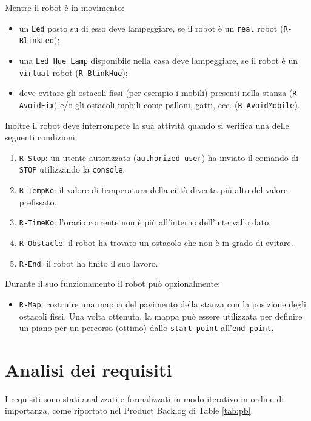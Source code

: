 \documentclass{llncs}
\newcommand{\action}[1]{\texttt{#1}\xspace}
\newcommand{\code}[1]{{\color{blue}\small{\texttt{#1}}}}
\newcommand{\fname}[1]{{\color{magenta}\small{\texttt{#1}}}}
\newcommand{\labelsec}[1]{\label{sec:#1}}
\begin{document}
Mentre il robot è in movimento:
\begin{itemize}
\item un \action{Led} posto su di esso deve lampeggiare, se il robot è un \fname{real} robot (\code{R-BlinkLed});
\item una \action{Led Hue Lamp} disponibile nella casa deve lampeggiare, se il robot è un \fname{virtual} robot (\code{R-BlinkHue});
\item deve evitare gli ostacoli fissi (per esempio i mobili) presenti nella stanza (\code{R-AvoidFix}) e/o gli ostacoli mobili come palloni, gatti, ecc. (\code{R-AvoidMobile}).
\end{itemize}

Inoltre il robot deve interrompere la sua attività quando si verifica una delle seguenti condizioni:
\begin{enumerate}
\item \code{R-Stop}: un utente autorizzato (\code{authorized user}) ha inviato il comando di \action{STOP} utilizzando la \code{console}.
\item \code{R-TempKo}: il valore di temperatura della città diventa più alto del valore prefissato.
\item \code{R-TimeKo}: l'orario corrente non è più all'interno dell'intervallo dato.
\item \code{R-Obstacle}: il robot ha trovato un ostacolo che non è in grado di evitare.
\item \code{R-End}: il robot ha finito il suo lavoro.
\end{enumerate}

Durante il suo funzionamento il robot può opzionalmente:
\begin{itemize}
\item \code{R-Map}: costruire una mappa del pavimento della stanza con la posizione degli ostacoli fissi. Una volta ottenuta, la mappa può essere utilizzata per definire un piano per un percorso (ottimo) dallo \code{start-point} all'\code{end-point}.
\end{itemize}


\section{Analisi dei requisiti}
\labelsec{ReqAnalysis}

I requisiti sono stati analizzati e formalizzati in modo iterativo in ordine di importanza, come riportato nel Product Backlog di Table \ref{tab:pb}. \\
\end{document}
